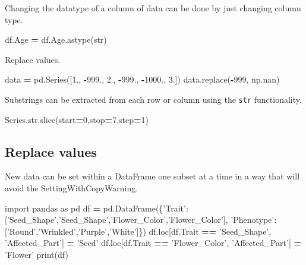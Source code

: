 \documentclass[]{book}
\newenvironment{Shaded}{\begin{snugshade}}{\end{snugshade}}
\newcommand{\DecValTok}[1]{\textcolor[rgb]{0.00,0.00,0.81}{#1}}
\newcommand{\StringTok}[1]{\textcolor[rgb]{0.31,0.60,0.02}{#1}}
\newcommand{\ImportTok}[1]{#1}
\newcommand{\OperatorTok}[1]{\textcolor[rgb]{0.81,0.36,0.00}{\textbf{#1}}}
\newcommand{\BuiltInTok}[1]{#1}
\newcommand{\NormalTok}[1]{#1}
\begin{document}
Changing the datatype of a column of data can be done by just changing
column type.

\begin{Shaded}
\begin{Highlighting}[]
\NormalTok{df.Age }\OperatorTok{=}\NormalTok{ df.Age.astype(}\BuiltInTok{str}\NormalTok{)}
\end{Highlighting}
\end{Shaded}

Replace values.

\begin{Shaded}
\begin{Highlighting}[]
\NormalTok{data }\OperatorTok{=}\NormalTok{ pd.Series([}\DecValTok{1}\NormalTok{., }\OperatorTok{-}\DecValTok{999}\NormalTok{., }\DecValTok{2}\NormalTok{., }\OperatorTok{-}\DecValTok{999}\NormalTok{., }\OperatorTok{-}\DecValTok{1000}\NormalTok{., }\DecValTok{3}\NormalTok{.])}
\NormalTok{data.replace(}\OperatorTok{-}\DecValTok{999}\NormalTok{, np.nan)}
\end{Highlighting}
\end{Shaded}

Substrings can be extracted from each row or column using the
\texttt{str} functionality.

\begin{Shaded}
\begin{Highlighting}[]
\NormalTok{Series.}\BuiltInTok{str}\NormalTok{.}\BuiltInTok{slice}\NormalTok{(start}\OperatorTok{=}\DecValTok{0}\NormalTok{,stop}\OperatorTok{=}\DecValTok{7}\NormalTok{,step}\OperatorTok{=}\DecValTok{1}\NormalTok{)}
\end{Highlighting}
\end{Shaded}

\subsection{Replace values}\label{replace-values}

New data can be set within a DataFrame one subset at a time in a way
that will avoid the SettingWithCopyWarning.

\begin{Shaded}
\begin{Highlighting}[]
\ImportTok{import}\NormalTok{ pandas }\ImportTok{as}\NormalTok{ pd}
\NormalTok{df }\OperatorTok{=}\NormalTok{ pd.DataFrame(\{}\StringTok{'Trait'}\NormalTok{:[}\StringTok{'Seed_Shape'}\NormalTok{,}\StringTok{'Seed_Shape'}\NormalTok{,}\StringTok{'Flower_Color'}\NormalTok{,}\StringTok{'Flower_Color'}\NormalTok{],}
                    \StringTok{'Phenotype'}\NormalTok{:[}\StringTok{'Round'}\NormalTok{,}\StringTok{'Wrinkled'}\NormalTok{,}\StringTok{'Purple'}\NormalTok{,}\StringTok{'White'}\NormalTok{]\})}
\NormalTok{df.loc[df.Trait }\OperatorTok{==} \StringTok{'Seed_Shape'}\NormalTok{, }\StringTok{'Affected_Part'}\NormalTok{] }\OperatorTok{=} \StringTok{'Seed'}
\NormalTok{df.loc[df.Trait }\OperatorTok{==} \StringTok{'Flower_Color'}\NormalTok{, }\StringTok{'Affected_Part'}\NormalTok{] }\OperatorTok{=} \StringTok{'Flower'}
\BuiltInTok{print}\NormalTok{(df)}
\end{Highlighting}
\end{Shaded}
\end{document}
